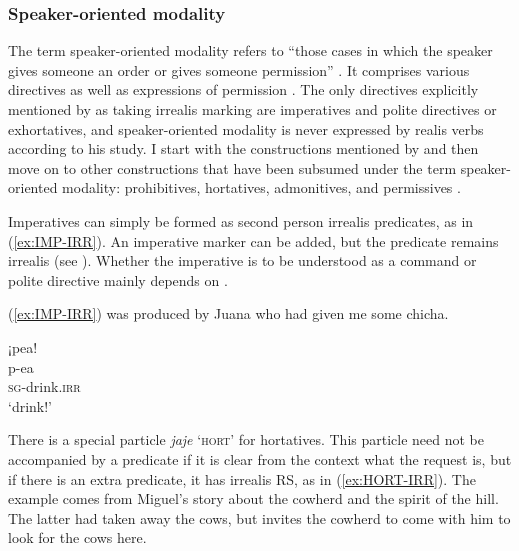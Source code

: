\subsubsection{Speaker-oriented modality}\label{Par:Speaker_oriented_modality}
The term speaker-oriented modality refers to “those cases in which the speaker gives someone an order or gives someone permission” \citep[31]{deHaan2005}. It comprises various directives as well as expressions of permission \citep[179]{Bybee_et_al1994}. The only directives explicitly mentioned by \citet[252]{Michael2014} as taking irrealis marking are imperatives and polite directives or exhortatives, and speaker-oriented modality is never expressed by realis verbs according to his study.
I start with the constructions mentioned by \citet[252]{Michael2014} and then move on to other constructions that have been subsumed under the term speaker-oriented modality: prohibitives, hortatives, admonitives, and permissives \citep[cf.][179]{Bybee_et_al1994}.

Imperatives can simply be formed as second person irrealis predicates, as in (\ref{ex:IMP-IRR}). An imperative marker can be added, but the predicate remains irrealis (see ). Whether the imperative is to be understood as a command or polite directive mainly depends on .

(\ref{ex:IMP-IRR}) was produced by Juana who had given me some chicha.

\ea\label{ex:IMP-IRR}
\begingl 
\glpreamble ¡pea!\\
\gla p-ea\\ 
\textsc{sg}-drink.\textsc{irr}\\ 
\glft ‘drink!’
 \trailingcitation{[jxx-e120516l-1.044]}
\xe
{}

There is a special particle \textit{jaje} ‘\textsc{hort}’ for hortatives. This particle need not be accompanied by a predicate if it is clear from the context what the request is, but if there is an extra predicate, it has irrealis RS, as in (\ref{ex:HORT-IRR}). The example comes from Miguel’s story about the cowherd and the spirit of the hill. The latter had taken away the cows, but invites the cowherd to come with him to look for the cows here.

